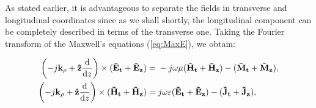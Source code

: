 \documentclass[11pt]{article}
\renewcommand{\v}[1]{\mathbf{#1}} %
\newcommand{\ti}[1]{\tilde{#1}} %
\renewcommand{\O}{\omega}  %
\newcommand{\E}{\varepsilon}  %
\renewcommand{\u}{\mu}  %
\newcommand{\p}{\rho}  %
\newcommand{\x}{\times}  %
\renewcommand{\^}{\hat}  %
\begin{document}
  As stated earlier, it is advantageous to separate the fields in transverse and longitudinal coordinates since as we shall shortly, the longitudinal component can be completely described in terms of the transverse one. Taking the Fourier transform of the Maxwell's equations (\ref{eq:MaxE}), we obtain:

  \begin{subequations}
    \begin{align}
      \left(-j\v{k_{\p}} + \v{\^{z}} \dv{}{z} \right)\x (\v{\ti{E}_t} + \v{\ti{E}_z})  ={}& -j \O \u (\v{\ti{H}_t} + \v{\ti{H}_z}) -
      (\v{\ti{M}_t} + \v{\ti{M}_z}),
      \label{eq:FT_E}\\
      \left(-j\v{k_{\p}} + \v{\^{z}} \dv{}{z} \right)\x (\v{\ti{H}_t} + \v{\ti{H}_z})  ={}& j \O \E (\v{\ti{E}_t} + \v{\ti{E}_z}) -
      (\v{\ti{J}_t} + \v{\ti{J}_z}),
      \label{eq:FT_H}
    \end{align}
    \label{eq:FT_MaxE}
  \end{subequations}
\end{document}
